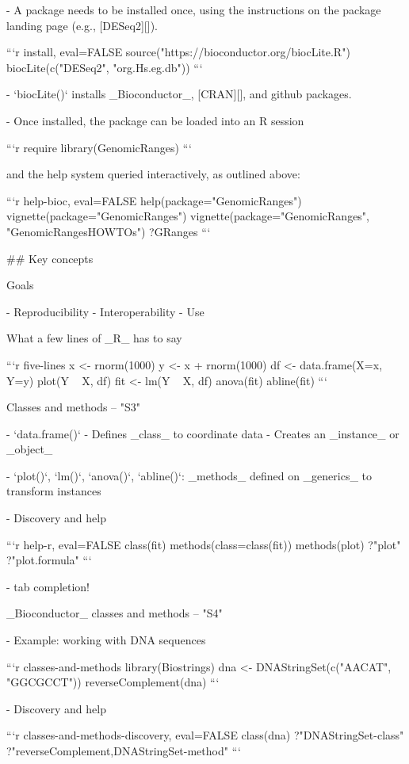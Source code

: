 - A package needs to be installed once, using the instructions on the
  package landing page (e.g., [DESeq2][]).

    ```{r install, eval=FALSE}
    source("https://bioconductor.org/biocLite.R")
    biocLite(c("DESeq2", "org.Hs.eg.db"))
    ```

- `biocLite()` installs _Bioconductor_, [CRAN][], and github packages.

- Once installed, the package can be loaded into an R session

    ```{r require}
    library(GenomicRanges)
    ```

    and the help system queried interactively, as outlined above:

    ```{r help-bioc, eval=FALSE}
    help(package="GenomicRanges")
    vignette(package="GenomicRanges")
    vignette(package="GenomicRanges", "GenomicRangesHOWTOs")
    ?GRanges
    ```

## Key concepts

Goals

- Reproducibility
- Interoperability
- Use

What a few lines of _R_ has to say

```{r five-lines}
x <- rnorm(1000)
y <- x + rnorm(1000)
df <- data.frame(X=x, Y=y)
plot(Y ~ X, df)
fit <- lm(Y ~ X, df)
anova(fit)
abline(fit)
```

Classes and methods -- "S3"

- `data.frame()`
  - Defines _class_ to coordinate data
  - Creates an _instance_ or _object_

- `plot()`, `lm()`, `anova()`, `abline()`: _methods_ defined on
  _generics_ to transform instances

- Discovery and help

    ```{r help-r, eval=FALSE}
    class(fit)
    methods(class=class(fit))
    methods(plot)
    ?"plot"
    ?"plot.formula"
    ```

- tab completion!

_Bioconductor_ classes and methods -- "S4"

- Example: working with DNA sequences

    ```{r classes-and-methods}
    library(Biostrings)
    dna <- DNAStringSet(c("AACAT", "GGCGCCT"))
    reverseComplement(dna)
    ```

- Discovery and help

    ```{r classes-and-methods-discovery, eval=FALSE}
    class(dna)
    ?"DNAStringSet-class"
    ?"reverseComplement,DNAStringSet-method"
    ```

